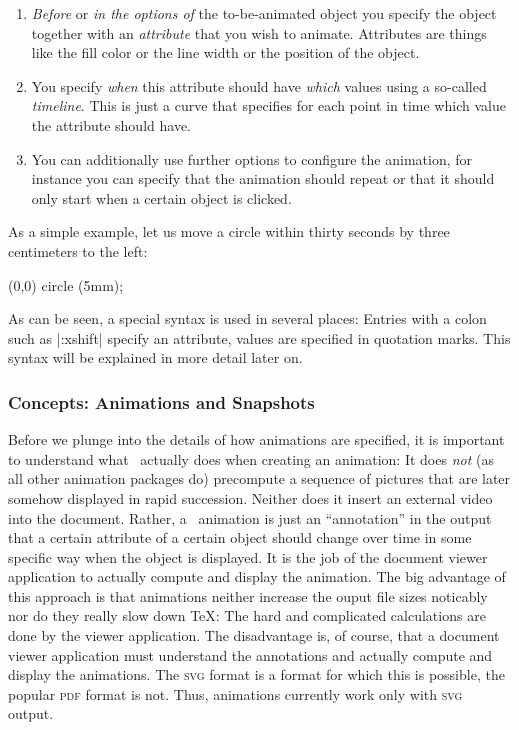 \begin{enumerate}
\item \emph{Before} or \emph{in the options of} the to-be-animated
  object you specify the object together with an \emph{attribute}
  that you wish to animate. Attributes are things like the fill color
  or the line width or the position of the object.
\item You specify \emph{when} this attribute should have \emph{which}
  values using a so-called \emph{timeline}. This is just a curve that
  specifies for each point in time which value the attribute should
  have.
\item You can additionally use further options to configure
  the animation, for instance you can specify that the animation
  should repeat or that it should only start when a certain object is
  clicked. 
\end{enumerate}

As a simple example, let us move a circle within thirty seconds by three
centimeters to the left:

\begin{codeexample}[width=2cm]
\tikz \draw [animate me = {:xshift = {0s = "0cm", 30s = "-3cm"}}] (0,0) circle (5mm);
\end{codeexample}

As can be seen, a special syntax is used in several places: Entries
with a colon such as |:xshift| specify an attribute, values
are specified in quotation marks. This syntax will be explained in 
more detail later on. 


\subsubsection{Concepts: Animations and Snapshots}

Before we plunge into the details of how animations are specified, it
is important to understand what 
\tikzname\ actually does when creating an animation: It does
\emph{not} (as all other animation packages do) precompute a sequence of
pictures that are later somehow displayed in rapid succession. Neither
does it insert an external video into the document. Rather, a
\tikzname\ animation is just an ``annotation'' in the output that a
certain attribute of a certain object should change over time in some
specific way when the object is displayed. It is the job of the
document viewer application to actually compute and display the
animation. The big advantage of this approach is that animations neither
increase the ouput file sizes noticably nor do they really slow down
\TeX: The hard and complicated calculations are done by the viewer
application. The disadvantage is, of course, that a document viewer
application must understand the annotations and actually compute and
display the animations. The \textsc{svg} format is a format for which
this is possible, the popular \textsc{pdf} format is not. Thus,
animations currently work only with \textsc{svg} output.

